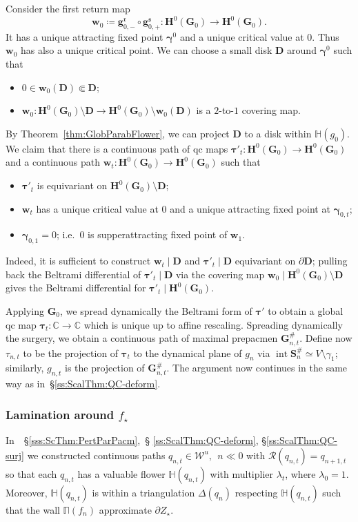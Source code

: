\documentclass[]{amsart}
\renewcommand{\sp}{{\ \ }}
\newcommand{\bDelta}{{\mathbb{\Delta}}}
\newcommand{\bPi}{{\mathbb{\Pi}}}
\newcommand\RR{\mathcal{R}}
\newcommand\intr{\operatorname{int}}
\newcommand{\bD}{{\mathbf D}}
\newcommand{\bS}{{\mathbf S}}
\newcommand{\bH}{{\mathbf H}}
\newcommand{\bG}{{\mathbf G}}
\newcommand{\fH}{{\mathbb H}}
\newcommand{\bbw}{{\mathbf w}}
\newcommand{\btau}{{ \boldsymbol {\tau}}}%
\newcommand{\bbg}{{\mathbf g}}
\newcommand{\bgamma}{{\boldsymbol{ \gamma}}}
\newcommand{\str}{{\star}}
\newcommand{\rr}{\mathfrak{r}}
\renewcommand{\ss}{\mathfrak{s}}
\newcommand\WW{\mathcal{W}}
\newcommand{\C}{\mathbb{C}}
\theoremstyle{remark}
\numberwithin{equation}{section}
\theoremstyle{definition}
\begin{document}
 Consider the first return map  \[\bbw_0\coloneqq\bbg_{0,-}^\rr\circ \bbg_{0,+}^\ss\colon \bH^0(\bG_0)\to \bH^0(\bG_0).\] It has a unique attracting fixed point $\bgamma^0$ and a unique critical value at $0$. Thus $\bbw_0$ has also a unique critical point. We can choose a small disk $\bD$ around $\bgamma^0$ such that 
\begin{itemize}
 \item   $0\in   \bbw_0(\bD)\Subset \bD$;
 \item $\bbw_0\colon  \bH^0(\bG_0)\setminus \bD \to   \bH^0(\bG_0)\setminus \bbw_0(\bD)$ is a $2$-to-$1$ covering map.
\end{itemize}
By Theorem~\ref{thm:GlobParabFlower}, we can project $\bD$ to a disk within $\fH(g_0)$.    
We claim that there is a continuous path of qc maps $\btau'_t\colon \bH^0(\bG_0)\to \bH^0(\bG_0)$ 
 and a continuous path $\bbw_t\colon \bH^0(\bG_0)\to \bH^0(\bG_0)$ such that
 \begin{itemize}
 \item $\btau'_t$ is equivariant on $\bH^0(\bG_0)\setminus \bD$;  
 \item $\bbw_t$ has a unique critical value at $0$ and a unique attracting fixed point at $\bgamma_{0,t}$;
 \item  $\bgamma_{0,1}=0$; i.e.~$0$ is supperattracting fixed point of $\bbw_1$.
 \end{itemize}
Indeed, it is sufficient to construct $\bbw_t\mid \bD$ and $\btau'_t \mid \bD$ equivariant on $\partial \bD$; pulling back the Beltrami  differential of $\btau'_t \mid \bD$ via the covering map $\bbw_0\mid  \bH^0(\bG_0)\setminus \bD$ gives the  Beltrami  differential for $\btau'_t \mid \bH^0(\bG_0)$.

Applying  $\bG_0$, we spread dynamically the Beltrami form of $\btau'$ to obtain a global qc map $\btau_t\colon \C\to \C$ which is unique up to affine rescaling. Spreading dynamically the surgery, we obtain a continuous path of maximal prepacmen $\bG^\#_{n,t}$. Define now $\tau_{n,t}$ to be the projection of $\btau_t$ to the dynamical plane of $g_n$ via $\intr\bS^{\#}_{n}\simeq V\setminus \gamma_1$;  similarly, $g_{n,t}$ is the projection of $\bG^\#_{n,t}$. The argument now continues in the same way as in~\S\ref{ss:ScalThm:QC-deform}.


\subsubsection{Lamination around $f_\str$} 
In~~\S\ref{sss:ScThm:PertParPacm},~\S
\ref{ss:ScalThm:QC-deform}, \S\ref{ss:ScalThm:QC-surj} we constructed continuous paths $q_{n,t}\in \WW^u,\sp n\ll0$ with $\RR(q_{n,t})=q_{n+1,t}$ so that each $q_{n,t}$ has a valuable flower $\fH(q_{n,t})$ with multiplier $\lambda_t$, where $\lambda_{0}=1$. Moreover, $\fH(q_{n,t})$ is within a triangulation $\bDelta (q_n)$ respecting $\fH(q_{n,t})$ such that the wall $\bPi(f_n)$ approximate $\partial Z_\str$.
\end{document}
